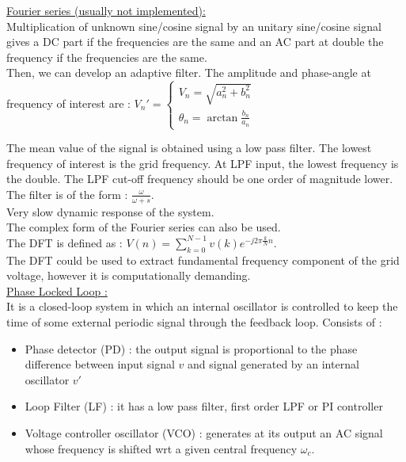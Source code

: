 \documentclass[../main.tex]{subfiles}
\begin{document}
\quad \underline{Fourier series (usually not implemented):}\\

Multiplication of unknown sine/cosine signal by an unitary sine/cosine signal gives a DC part if the frequencies are the same and an AC part at double the frequency if the frequencies are the same.\\

Then, we can develop an adaptive filter. The amplitude and phase-angle at frequency of interest are : $V_n' = \begin{cases}
    V_n = \sqrt{a_n^2 + b_n^2}\\
    \theta_n = \arctan \frac{b_n}{a_n}
\end{cases}$

The mean value of the signal is obtained using a low pass filter. The lowest frequency of interest is the grid frequency. At LPF input, the lowest frequency is the double. The LPF cut-off frequency should be one order of magnitude lower. The filter is of the form : $\frac{\omega}{\omega+s}$.\\
\warning Very slow dynamic response of the system.\\
The complex form of the Fourier series can also be used. \\

The DFT is defined as : $V(n) = \sum_{k=0}^{N-1} v(k) e^{-j2\pi \frac{k}{N}n}$.\\
The DFT could be used to extract fundamental frequency component of the grid voltage, however it is computationally demanding.\\

\quad \underline{Phase Locked Loop :}\\

It is a closed-loop system in which an internal oscillator is controlled to keep the time of some external periodic signal through the feedback loop. Consists of : \begin{itemize}
    \item Phase detector (PD) : the output signal is proportional to the phase difference between input signal $v$ and signal generated by an internal oscillator $v'$
    \item Loop Filter (LF) : it has a low pass filter, first order LPF or PI controller
    \item Voltage controller oscillator (VCO) : generates at its output an AC signal whose frequency is shifted wrt a given central frequency $\omega_c$.
\end{itemize}
\end{document}
